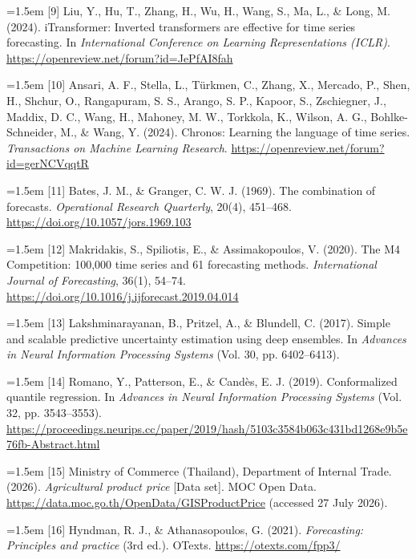 \documentclass[review,3p,times]{elsarticle}
\begin{document}
\hangindent=1.5em [9] Liu, Y., Hu, T., Zhang, H., Wu, H., Wang, S., Ma, L., \& Long, M. (2024). iTransformer: Inverted transformers are effective for time series forecasting. In \emph{International Conference on Learning Representations (ICLR)}. \url{https://openreview.net/forum?id=JePfAI8fah}\par\medskip
\hangindent=1.5em [10] Ansari, A. F., Stella, L., T\"urkmen, C., Zhang, X., Mercado, P., Shen, H., Shchur, O., Rangapuram, S. S., Arango, S. P., Kapoor, S., Zschiegner, J., Maddix, D. C., Wang, H., Mahoney, M. W., Torkkola, K., Wilson, A. G., Bohlke-Schneider, M., \& Wang, Y. (2024). Chronos: Learning the language of time series. \emph{Transactions on Machine Learning Research}. \url{https://openreview.net/forum?id=gerNCVqqtR}\par\medskip
\hangindent=1.5em [11] Bates, J. M., \& Granger, C. W. J. (1969). The combination of forecasts. \emph{Operational Research Quarterly}, 20(4), 451--468. \url{https://doi.org/10.1057/jors.1969.103}\par\medskip
\hangindent=1.5em [12] Makridakis, S., Spiliotis, E., \& Assimakopoulos, V. (2020). The M4 Competition: 100,000 time series and 61 forecasting methods. \emph{International Journal of Forecasting}, 36(1), 54--74. \url{https://doi.org/10.1016/j.ijforecast.2019.04.014}\par\medskip
\hangindent=1.5em [13] Lakshminarayanan, B., Pritzel, A., \& Blundell, C. (2017). Simple and scalable predictive uncertainty estimation using deep ensembles. In \emph{Advances in Neural Information Processing Systems} (Vol. 30, pp. 6402--6413).\par\medskip
\hangindent=1.5em [14] Romano, Y., Patterson, E., \& Candès, E. J. (2019). Conformalized quantile regression. In \emph{Advances in Neural Information Processing Systems} (Vol. 32, pp. 3543--3553). \url{https://proceedings.neurips.cc/paper/2019/hash/5103c3584b063c431bd1268e9b5e76fb-Abstract.html}\par\medskip
\hangindent=1.5em [15] Ministry of Commerce (Thailand), Department of Internal Trade. (2026). \emph{Agricultural product price} [Data set]. MOC Open Data. \url{https://data.moc.go.th/OpenData/GISProductPrice} (accessed 27 July 2026).\par\medskip
\hangindent=1.5em [16] Hyndman, R. J., \& Athanasopoulos, G. (2021). \emph{Forecasting: Principles and practice} (3rd ed.). OTexts. \url{https://otexts.com/fpp3/}\par\medskip
\end{document}
